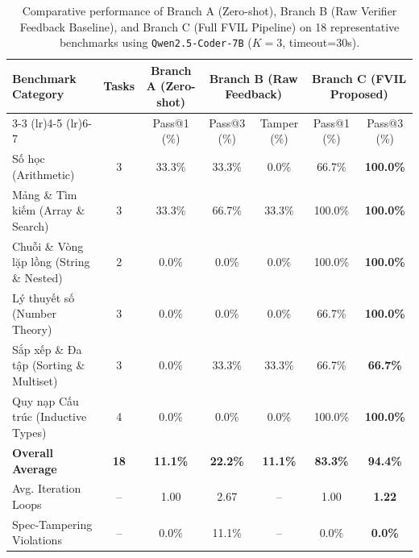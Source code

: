\begin{table}[t]
\centering
\caption{Comparative performance of Branch A (Zero-shot), Branch B (Raw Verifier Feedback Baseline), and Branch C (Full FVIL Pipeline) on 18 representative benchmarks using \texttt{Qwen2.5-Coder-7B} ($K=3$, timeout=30s).}
\label{tab:three_branches_ablation}
\small
\begin{tabular}{lcccccc}
\toprule
\multirow{2}{*}{\textbf{Benchmark Category}} & \multirow{2}{*}{\textbf{Tasks}} & \textbf{Branch A (Zero-shot)} & \multicolumn{2}{c}{\textbf{Branch B (Raw Feedback)}} & \multicolumn{2}{c}{\textbf{Branch C (FVIL Proposed)}} \\
\cmidrule(lr){3-3} \cmidrule(lr){4-5} \cmidrule(lr){6-7}
 & & Pass@1 (\%) & Pass@3 (\%) & Tamper (\%) & Pass@1 (\%) & Pass@3 (\%) \\
\midrule
Số học (Arithmetic) & 3 & 33.3\% & 33.3\% & 0.0\% & 66.7\% & \textbf{100.0\%} \\
Mảng \& Tìm kiếm (Array \& Search) & 3 & 33.3\% & 66.7\% & 33.3\% & 100.0\% & \textbf{100.0\%} \\
Chuỗi \& Vòng lặp lồng (String \& Nested) & 2 & 0.0\% & 0.0\% & 0.0\% & 100.0\% & \textbf{100.0\%} \\
Lý thuyết số (Number Theory) & 3 & 0.0\% & 0.0\% & 0.0\% & 66.7\% & \textbf{100.0\%} \\
Sắp xếp \& Đa tập (Sorting \& Multiset) & 3 & 0.0\% & 33.3\% & 33.3\% & 66.7\% & \textbf{66.7\%} \\
Quy nạp Cấu trúc (Inductive Types) & 4 & 0.0\% & 0.0\% & 0.0\% & 100.0\% & \textbf{100.0\%} \\
\midrule
\textbf{Overall Average} & \textbf{18} & \textbf{11.1\%} & \textbf{22.2\%} & \textbf{11.1\%} & \textbf{83.3\%} & \textbf{94.4\%} \\
Avg. Iteration Loops & -- & 1.00 & 2.67 & -- & 1.00 & \textbf{1.22} \\
Spec-Tampering Violations & -- & 0.0\% & 11.1\% & -- & 0.0\% & \textbf{0.0\%} \\
\bottomrule
\end{tabular}
\end{table}
